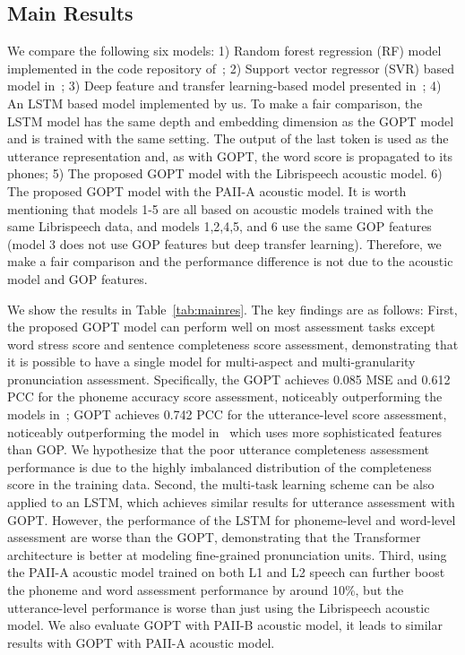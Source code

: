\documentclass{article}
\begin{document}
\subsection{Main Results}

We compare the following six models: 1) Random forest regression (RF) model implemented in the code repository of~\cite{zhang2021speechocean762}; 2) Support vector regressor (SVR) based model in~\cite{zhang2021speechocean762}; 3) Deep feature and transfer learning-based model presented in~\cite{lin2021deep}; 4) An LSTM based model implemented by us. To make a fair comparison, the LSTM model has the same depth and embedding dimension as the GOPT model and is trained with the same setting. The output of the last token is used as the utterance representation and, as with GOPT, the word score is propagated to its phones; 5) The proposed GOPT model with the Librispeech acoustic model. 6) The proposed GOPT model with the PAII-A acoustic model. It is worth mentioning that models 1-5 are all based on acoustic models trained with the same Librispeech data, and models 1,2,4,5, and 6 use the same GOP features (model 3 does not use GOP features but deep transfer learning). Therefore, we make a fair comparison and the performance difference is not due to the acoustic model and GOP features.

We show the results in Table~\ref{tab:mainres}. The key findings are as follows: First, the proposed GOPT model can perform well on most assessment tasks except word stress score and sentence completeness score assessment, demonstrating that it is possible to have a single model for multi-aspect and multi-granularity pronunciation assessment. Specifically, the GOPT achieves 0.085 MSE and 0.612 PCC for the phoneme accuracy score assessment, noticeably outperforming the models in~\cite{zhang2021speechocean762}; GOPT achieves 0.742 PCC for the utterance-level score assessment, noticeably outperforming the model in~\cite{lin2021deep} which uses more sophisticated features than GOP. We hypothesize that the poor utterance completeness assessment performance is due to the highly imbalanced distribution of the completeness score in the training data. Second, the multi-task learning scheme can be also applied to an LSTM, which achieves similar results for utterance assessment with GOPT.  However, the performance of the LSTM for phoneme-level and word-level assessment are worse than the GOPT, demonstrating that the Transformer architecture is better at modeling fine-grained pronunciation units. Third, using the PAII-A acoustic model trained on both L1 and L2 speech can further boost the phoneme and word assessment performance by around 10\%, but the utterance-level performance is worse than just using the Librispeech acoustic model. We also evaluate GOPT with PAII-B acoustic model, it leads to similar results with GOPT with PAII-A acoustic model.
\end{document}

